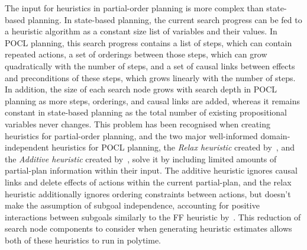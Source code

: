 The input for heuristics in partial-order planning is more complex than state-based planning. In state-based planning, the current search progress can be fed to a heuristic algorithm as a constant size list of variables and their values. In POCL planning, this search progress contains a list of steps, which can contain repeated actions, a set of orderings between those steps, which can grow quadratically with the number of steps, and a set of causal links between effects and preconditions of these steps, which grows linearly with the number of steps. In addition, the size of each search node grows with search depth in POCL planning as more steps, orderings, and causal links are added, whereas it remains constant in state-based planning as the total number of existing propositional variables never changes. This problem has been recognised when creating heuristics for partial-order planning, and the two major well-informed domain-independent heuristics for POCL planning, the \textit{Relax heuristic} created by~\cite{Nguyen2001UCPOPAndRelaxHeuristic}, and the \textit{Additive heuristic} created by~\cite{Younes2003VHPOPAndAdditiveHeuristic}, solve it by including limited amounts of partial-plan information within their input. The additive heuristic ignores causal links and delete effects of actions within the current partial-plan, and the relax heuristic additionally ignores ordering constraints between actions, but doesn't make the assumption of subgoal independence, accounting for positive interactions between subgoals similarly to the FF heuristic by~\cite{Hoffmann2001FFPlanning}. This reduction of search node components to consider when generating heuristic estimates allows both of these heuristics to run in polytime.\\


